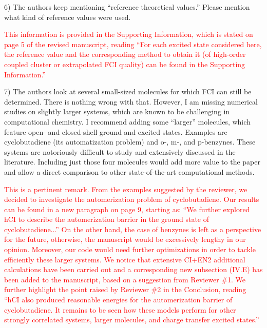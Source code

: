 \documentclass[10pt]{letter}
\newcommand{\alert}[1]{\textcolor{red}{#1}}
\begin{document}
\begin{letter}
{6) The authors keep mentioning ``reference theoretical values.'' Please mention what kind of reference values were used.
}

\alert{
This information is provided in the Supporting Information, which is stated on page 5 of the revised manuscript, reading
``For each excited state considered here, the reference value and the corresponding method to obtain it (of high-order coupled cluster or extrapolated FCI quality) can be found in the Supporting Information.''
}

{7) The authors look at several small-sized molecules for which FCI can still be determined. There is nothing wrong with that. However, I am missing numerical studies on slightly larger systems, which are known to be challenging in computational chemistry. I recommend adding some ``larger'' molecules, which feature open- and closed-shell ground and excited states. Examples are cyclobutadiene (its automatization problem) and o-, m-, and p-benzynes. These systems are notoriously difficult to study and extensively discussed in the literature. Including just those four molecules would add more value to the paper and allow a direct comparison to other state-of-the-art computational methods.
}

\alert{
This is a pertinent remark.
From the examples suggested by the reviewer, we decided to investigate the automerization problem of cyclobutadiene.
Our results can be found in a new paragraph on page 9, starting as:
``We further explored hCI to describe the automerization barrier in the ground state of cyclobutadiene...''
On the other hand, the case of benzynes is left as a perspective for the future, otherwise, the manuscript would be excessively lengthy in our opinion.
Moreover, our code would need further optimizations in order to tackle efficiently these larger systems.
We notice that extensive CI+EN2 additional calculations have been carried out and a corresponding new subsection (IV.E) has been added to the manuscript, based on a suggestion from Reviewer \#1.
We further highlight the point raised by Reviewer \#2 in the Conclusion, reading
``hCI also produced reasonable energies for the automerization barrier of cyclobutadiene.
It remains to be seen how these models perform for other strongly correlated systems, larger molecules, and charge transfer excited states.''
}

\end{letter}
\end{document}
